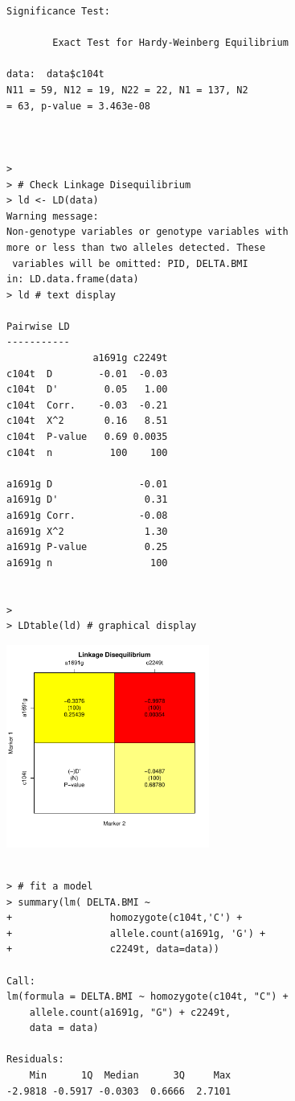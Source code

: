 \documentclass{report}
\begin{document}
{\begin{verbatim}
Significance Test:

        Exact Test for Hardy-Weinberg Equilibrium

data:  data$c104t 
N11 = 59, N12 = 19, N22 = 22, N1 = 137, N2
= 63, p-value = 3.463e-08



> 
> # Check Linkage Disequilibrium
> ld <- LD(data)
Warning message: 
Non-genotype variables or genotype variables with 
more or less than two alleles detected. These
 variables will be omitted: PID, DELTA.BMI 
in: LD.data.frame(data) 
> ld # text display

Pairwise LD
-----------
               a1691g c2249t
c104t  D        -0.01  -0.03
c104t  D'        0.05   1.00
c104t  Corr.    -0.03  -0.21
c104t  X^2       0.16   8.51
c104t  P-value   0.69 0.0035
c104t  n          100    100
                            
a1691g D               -0.01
a1691g D'               0.31
a1691g Corr.           -0.08
a1691g X^2              1.30
a1691g P-value          0.25
a1691g n                 100
                            

> 
> LDtable(ld) # graphical display
\end{verbatim}

\begin{center}
\includegraphics[width=0.5\textwidth]{LD.pdf}
\end{center}
\begin{verbatim}

> # fit a model
> summary(lm( DELTA.BMI ~ 
+                 homozygote(c104t,'C') +
+                 allele.count(a1691g, 'G') +
+                 c2249t, data=data))

Call:
lm(formula = DELTA.BMI ~ homozygote(c104t, "C") + 
    allele.count(a1691g, "G") + c2249t, 
    data = data)

Residuals:
    Min      1Q  Median      3Q     Max 
-2.9818 -0.5917 -0.0303  0.6666  2.7101 


\end{verbatim}}
\end{document}
